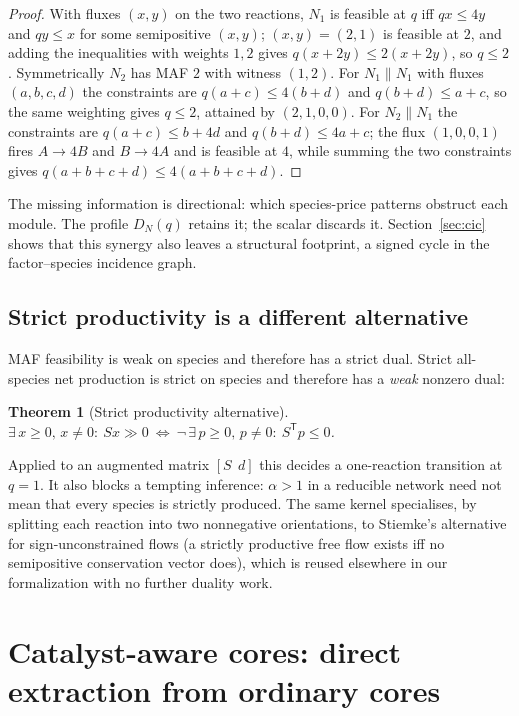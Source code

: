 \documentclass[11pt,a4paper]{article}
\theoremstyle{plain}
\newtheorem{theorem}{Theorem}[section]
\theoremstyle{definition}
\theoremstyle{remark}
\newcommand{\Tp}{^{\mathsf T}}
\begin{document}
\begin{proof}
With fluxes $(x,y)$ on the two reactions, $N_1$ is feasible at $q$ iff $qx\le 4y$ and $qy\le x$ for some semipositive $(x,y)$; $(x,y)=(2,1)$ is feasible at $2$, and adding the inequalities with weights $1,2$ gives $q(x+2y)\le 2(x+2y)$, so $q\le 2$. Symmetrically $N_2$ has MAF $2$ with witness $(1,2)$. For $N_1\parallel N_1$ with fluxes $(a,b,c,d)$ the constraints are $q(a+c)\le 4(b+d)$ and $q(b+d)\le a+c$, so the same weighting gives $q\le 2$, attained by $(2,1,0,0)$. For $N_2\parallel N_1$ the constraints are $q(a+c)\le b+4d$ and $q(b+d)\le 4a+c$; the flux $(1,0,0,1)$ fires $A\to 4B$ and $B\to 4A$ and is feasible at $4$, while summing the two constraints gives $q(a+b+c+d)\le 4(a+b+c+d)$.
\end{proof}

The missing information is directional: which species-price patterns obstruct each module. The profile $D_N(q)$ retains it; the scalar discards it. Section~\ref{sec:cic} shows that this synergy also leaves a structural footprint, a signed cycle in the factor--species incidence graph.

\subsection{Strict productivity is a different alternative}

MAF feasibility is weak on species and therefore has a strict dual. Strict all-species net production is strict on species and therefore has a \emph{weak} nonzero dual:
\begin{theorem}[Strict productivity alternative]\label{thm:strictprod}
$\exists\,x\ge 0,\,x\neq 0:\ Sx\gg 0\ \iff\ \neg\,\exists\,p\ge 0,\,p\neq 0:\ S\Tp p\le 0$.
\end{theorem}
Applied to an augmented matrix $[S\ \ d]$ this decides a one-reaction transition at $q=1$. It also blocks a tempting inference: $\alpha>1$ in a reducible network need not mean that every species is strictly produced. The same kernel specialises, by splitting each reaction into two nonnegative orientations, to Stiemke's alternative for sign-unconstrained flows (a strictly productive free flow exists iff no semipositive conservation vector does), which is reused elsewhere in our formalization with no further duality work.

\section{Catalyst-aware cores: direct extraction from ordinary cores}\label{sec:cs}
\end{document}
